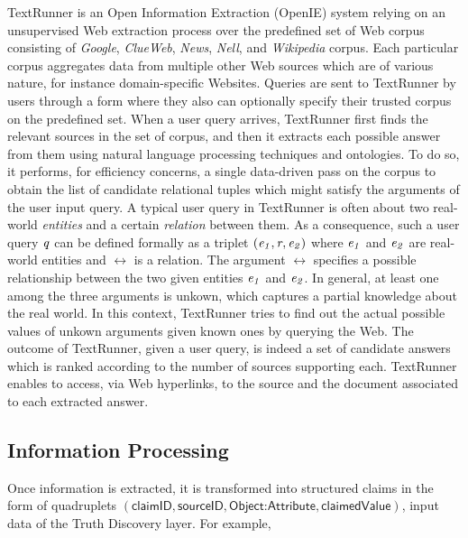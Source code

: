 TextRunner is  an Open Information Extraction (OpenIE) system relying 
on an unsupervised Web extraction process over the predefined 
set of Web corpus consisting of \emph{Google}, \emph{ClueWeb}, \emph{News}, \emph{Nell}, and 
\emph{Wikipedia} corpus. Each particular corpus aggregates data from multiple 
other Web sources which are of various nature, for instance domain-specific Websites.
Queries are sent to TextRunner by users through a form where 
they also can optionally specify their trusted corpus on the predefined set.
When a user query arrives, TextRunner first finds the relevant
sources in the set of corpus, and then it extracts each possible answer from them
using natural language processing techniques and ontologies. 
To do so, it performs, for efficiency concerns, a single data-driven
pass on the corpus to obtain the list of candidate relational tuples 
which might satisfy the arguments of the user input query. 
A typical user query in TextRunner is often about 
two real-world \emph{entities} and a certain \emph{relation} between them.
As a consequence, such a user query $\mathit{q}$ can be defined formally as a triplet $(\mathit{e_{1}}, \mathit{r}_{}, \mathit{e_{2}})$
where $\mathit{e_{1}}$ and $\mathit{e_{2}}$ are real-world entities and $\rel{}$ is a relation. The argument $\rel{}$ 
specifies a possible relationship between the two given entities $\mathit{e_{1}}$ and $\mathit{e_{2}}$. In general,
at least one among the three arguments is unkown, which captures a partial knowledge about the real world. 
In this context, TextRunner tries to find out the actual possible values of unkown arguments given 
known ones by querying the Web. The outcome of TextRunner, given a user query, is indeed a set of candidate answers which is ranked according 
to the number of sources supporting each. TextRunner  enables to access, via Web hyperlinks, to the source
and the document associated to each extracted answer. 

\subsection{Information Processing}
Once information is extracted, it is transformed into structured claims 
in the form of quadruplets $(\textsf{claimID}, \textsf{sourceID}, \textsf{Object:Attribute},\textsf{claimedValue})$, input data of the Truth Discovery layer. For example, 




